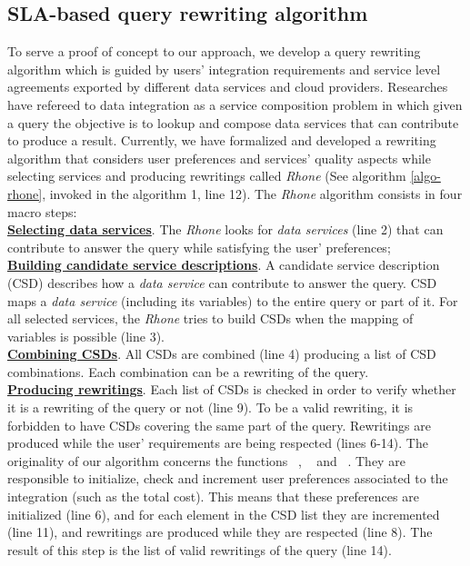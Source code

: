 \subsection{SLA-based query rewriting algorithm}
To serve a proof of concept to our approach, we develop a query
rewriting algorithm which is guided by users' integration requirements and
service level agreements exported by different data services and cloud
providers. Researches have refereed to data integration as a service composition problem
in which given a query the objective is to lookup and compose data services that
can contribute to produce a result. Currently, we have formalized and developed a rewriting
algorithm that considers user preferences and services' quality aspects while
selecting services and producing rewritings called \textit{Rhone} (See algorithm
\ref{algo-rhone}, invoked in the algorithm 1, line 12).
The \textit{Rhone} algorithm consists in four macro steps: 
\\
\textbf{\underline{Selecting data services}}. The \textit{Rhone} looks for
\textit{data services} (line 2) that can contribute to answer the query while
satisfying the user' preferences; \\
\textbf{\underline{Building candidate service descriptions}}. A candidate
service description (CSD) describes how a \textit{data service} can contribute to answer the query. CSD maps a \textit{data service} (including its variables) to the entire query or part of it. For all selected services, the \textit{Rhone} tries to build CSDs when the mapping of variables is possible (line
3). \\
\textbf{\underline{Combining CSDs}}. All CSDs are combined (line 4) producing a
list of CSD combinations. Each combination can be a rewriting of the query. \\
\textbf{\underline{Producing rewritings}}. Each list of CSDs is checked in order
to verify whether it is a rewriting of the query or not (line 9). To be a
valid rewriting, it is forbidden to have CSDs covering the same part of the query.
Rewritings are produced while the user' requirements are being respected (lines 6-14).
%
The originality of our algorithm concerns the functions ~\!\tqI{}, ~\!\tqT{} and ~\!\tqS{}.     
They are responsible to initialize, check and increment user preferences associated to the integration (such as the total cost). This means that these preferences are initialized (line 6), and for each element in the CSD list they are incremented (line 11), and rewritings are produced while they are respected (line 8).  The result of this step is the list of valid rewritings of the query (line 14).


